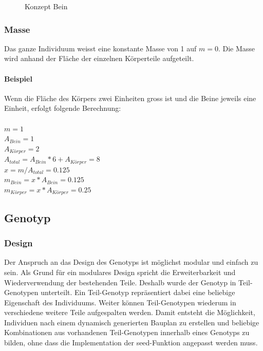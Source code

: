       \begin{figure}[H]
        \centering
        
        \caption{Konzept Bein\label{fig:conceptLeg}}
      \end{figure}

      \subsubsection{Masse\label{subs:Masse}}

        Das ganze Individuum weisst eine konstante Masse von 1 auf \(m = 0\).
        Die Masse wird anhand der Fläche der einzelnen Körperteile aufgeteilt.

      \paragraph{Beispiel\label{par:MasseExample}}

        Wenn die Fläche des Körpers zwei Einheiten gross ist und die Beine jeweils eine Einheit,
        erfolgt folgende Berechnung:
        \\
        \\
        \(m = 1\) \\
        \(A_{Bein} = 1\) \\
        \(A_{Körper} = 2\) \\
        \(A_{total} = A_{Bein} * 6 + A_{Körper} = 8 \) \\
        \( x = m / A_{total} = 0.125 \) \\
        \(m_{Bein} = x * A_{Bein} = 0.125\) \\
        \(m_{Körper} = x * A_{Körper} = 0.25\) \\

    \subsection{Genotyp\label{sub:Genotype}}

      \subsubsection{Design\label{subsub:GenotypeDesign}}

        Der Anspruch an das Design des Genotyps ist möglichst modular und einfach zu sein.
        Als Grund für ein modulares Design spricht die Erweiterbarkeit und Wiederverwendung der bestehenden Teile.
        Deshalb wurde der Genotyp in Teil-Genotypen unterteilt.
        Ein Teil-Genotyp repräsentiert dabei eine beliebige Eigenschaft des Individuums.
        Weiter können Teil-Genotypen wiederum in verschiedene weitere Teile aufgespalten werden.
        Damit entsteht die Möglichkeit, Individuen nach einem dynamisch generierten Bauplan zu erstellen
        und beliebige Kombinationen aus vorhandenen Teil-Genotypen innerhalb eines Genotyps zu bilden,
        ohne dass die Implementation der seed-Funktion angepasst werden muss.

